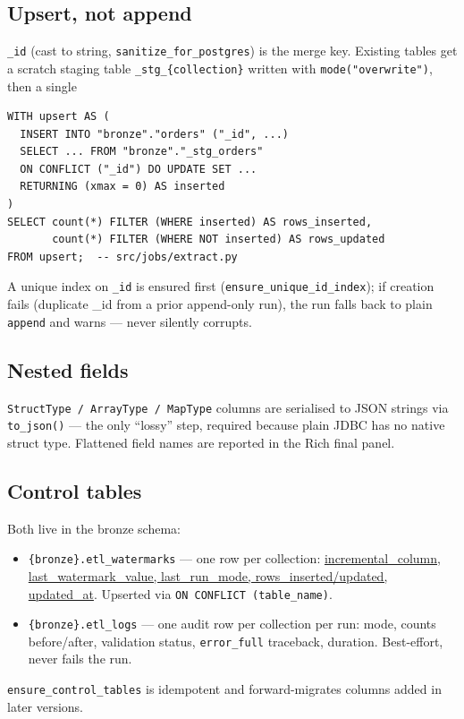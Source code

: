 \documentclass[11pt,a4paper]{article}
\begin{document}
\subsection{Upsert, not append}
\texttt{\_id} (cast to string, \texttt{sanitize\_for\_postgres}) is the merge key. Existing tables get a scratch staging table \texttt{\_stg\_\{collection\}} written with \texttt{mode("overwrite")}, then a single
\begin{lstlisting}[style=sql,caption={Merge — inserted vs updated via xmin}]
WITH upsert AS (
  INSERT INTO "bronze"."orders" ("_id", ...)
  SELECT ... FROM "bronze"."_stg_orders"
  ON CONFLICT ("_id") DO UPDATE SET ...
  RETURNING (xmax = 0) AS inserted
)
SELECT count(*) FILTER (WHERE inserted) AS rows_inserted,
       count(*) FILTER (WHERE NOT inserted) AS rows_updated
FROM upsert;  -- src/jobs/extract.py
\end{lstlisting}
A unique index on \texttt{\_id} is ensured first (\texttt{ensure\_unique\_id\_index}); if creation fails (duplicate \_id from a prior append-only run), the run falls back to plain \texttt{append} and warns — never silently corrupts.

\subsection{Nested fields}
\texttt{StructType / ArrayType / MapType} columns are serialised to JSON strings via \texttt{to\_json()} — the only ``lossy'' step, required because plain JDBC has no native struct type. Flattened field names are reported in the Rich final panel.

\subsection{Control tables}
Both live in the bronze schema:
\begin{itemize}[leftmargin=1.4em]
  \item \texttt{\{bronze\}.etl\_watermarks} — one row per collection: \url{incremental_column, last_watermark_value, last_run_mode, rows_inserted/updated, updated_at}. Upserted via \texttt{ON CONFLICT (table\_name)}.
  \item \texttt{\{bronze\}.etl\_logs} — one audit row per collection per run: mode, counts before/after, validation status, \texttt{error\_full} traceback, duration. Best-effort, never fails the run.
\end{itemize}
\texttt{ensure\_control\_tables} is idempotent and forward-migrates columns added in later versions.
\end{document}
